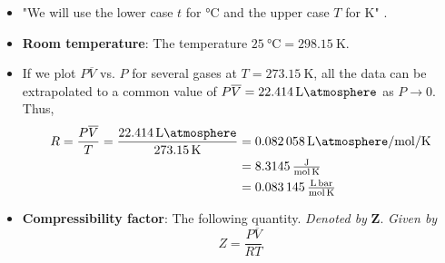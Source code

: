 \documentclass[../notes.tex]{subfiles}
\begin{document}
\begin{itemize}
    \item "We will use the lower case $t$ for \si{\celsius} and the upper case $T$ for \si{\kelvin}" \parencite[640]{bib:McQuarrieSimon}.
    \item \textbf{Room temperature}: The temperature $\SI{25}{\celsius}=\SI{298.15}{\kelvin}$.
    \item If we plot $P\overline{V}$ vs. $P$ for several gases at $T=\SI{273.15}{\kelvin}$, all the data can be extrapolated to a common value of $P\overline{V}=\SI{22.414}{\liter\atmosphere}$ as $P\to 0$. Thus,
    \begin{align*}
        R = \frac{P\overline{V}}{T} = \frac{\SI{22.414}{\liter\atmosphere}}{\SI{273.15}{\kelvin}} &= \SI[per-mode=fraction,fraction-function=\tfrac]{0.082058}{\liter\atmosphere\per\mole\per\kelvin}\\
        &= \SI[per-mode=fraction,fraction-function=\tfrac]{8.3145}{\joule\per\mole\per\kelvin}\\
        &= \SI[per-mode=fraction,fraction-function=\tfrac]{0.083145}{\liter\bar\per\mole\per\kelvin}
    \end{align*}
    \item \textbf{Compressibility factor}: The following quantity. \emph{Denoted by} $\bm{Z}$. \emph{Given by}
    \begin{equation*}
        Z = \frac{P\overline{V}}{RT}
    \end{equation*}
    \begin{figure}[h!]
        \centering
        \begin{subfigure}[b]{0.49\linewidth}
            \centering
\end{subfigure}
\end{figure}
\end{itemize}
\end{document}
